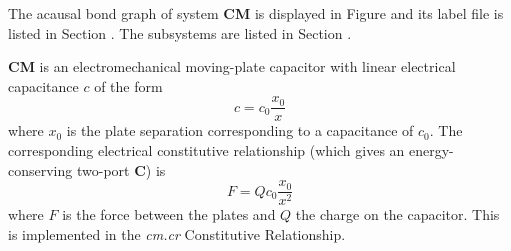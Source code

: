 

   The acausal bond graph of system \textbf{CM} is
   displayed in Figure  and its label
   file is listed in Section .
   The subsystems are listed in Section .

{\bf CM} is an electromechanical moving-plate  capacitor with linear
electrical capacitance $c$ of the form
\begin{equation}
  c = c_0 \frac{x_0}{x}
\end{equation}
where $x_0$ is the plate separation corresponding to a capacitance of
$c_0$.
The corresponding electrical constitutive relationship (which gives an
energy-conserving two-port \textbf{C}) is
\begin{equation}
  F = Q c_0 \frac{x_0}{x^2}
\end{equation}
where $F$ is the force between the plates and $Q$ the charge on the
capacitor.
This is implemented in the \emph{cm.cr} Constitutive Relationship.
